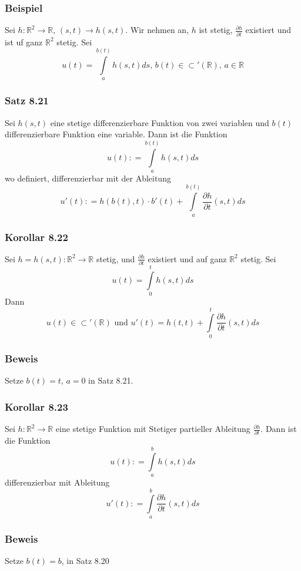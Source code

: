 \subsubsection*{Beispiel}
Sei $h:\mathbb{R}^2\rightarrow\mathbb{R}$, $\left( s,t\right)\rightarrow h\left(s,t \right)$. Wir nehmen an, $h$ ist stetig, $\frac{\partial h}{\partial t}$ existiert und ist uf ganz $\mathbb{R}^2$ stetig. Sei 
\[u(t) = \int\limits_a^{b(t)} {h(s,t)ds} {\text{, }}b(t) \in\subset '\left( \mathbb{R} \right){\text{, }}a \in\mathbb{R}\]

\subsubsection*{Satz 8.21}
Sei $h(s,t)$ eine stetige differenzierbare Funktion von zwei variablen und $b(t)$ differenzierbare Funktion eine variable. Dann ist die Funktion \[u(t): = \int\limits_a^{b(t)} {h(s,t)ds} \] wo definiert, differenzierbar mit der Ableitung \[u'(t): = h\left( {b(t),t} \right) \cdot b'(t) + \int\limits_a^{b(t)} {\frac{{\partial h}}{{\partial t}}\left( {s,t} \right)ds} \]
\subsubsection*{Korollar 8.22}
Sei $h=h\left( s,t\right) :\mathbb{R}^2\rightarrow\mathbb{R}$ stetig, und $\frac{\partial h}{\partial t}$ existiert und auf ganz $\mathbb{R}^2$ stetig. Sei \[u(t) = \int\limits_0^t {h\left( {s,t} \right)ds} \] Dann \[u(t) \in  \subset '\left( \mathbb{R}\right)\text{ und }u'(t) = h\left( {t,t} \right) + \int\limits_0^t {\frac{{\partial h}}{{\partial t}}\left( {s,t} \right)ds} \]

\subsubsection*{Beweis}
Setze $b(t)=t$, $a=0$ in Satz 8.21.

\subsubsection*{Korollar 8.23}
Sei $h:\mathbb{R}^2\rightarrow\mathbb{R}$ eine stetige Funktion mit Stetiger partieller Ableitung $\frac{\partial h}{\partial t}$. Dann ist die Funktion \[u(t): = \int\limits_a^b {h(s,t)ds} \] differenzierbar mit Ableitung \[u'(t): = \int\limits_a^b {\frac{{\partial h}}{{\partial t}}(s,t)ds} \] 

\subsubsection*{Beweis}
Setze $b(t)=b$, in Satz 8.20

